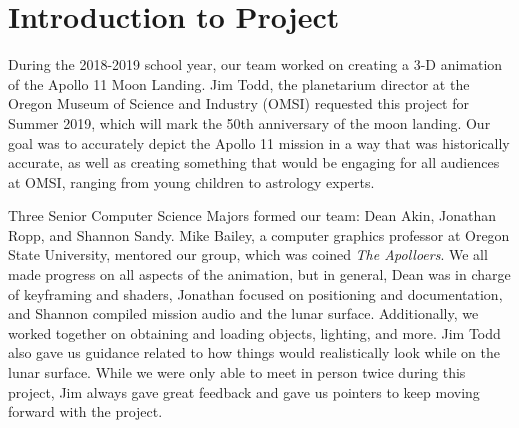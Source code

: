 \documentclass[onecolumn, draftclsnofoot,10pt, compsoc]{IEEEtran}
\begin{document}
\section{Introduction to Project}

During the 2018-2019 school year, our team worked on creating a 3-D animation of the  Apollo 11 Moon Landing. Jim Todd, the planetarium director at the Oregon Museum of Science and Industry (OMSI) requested this project for Summer 2019, which will mark the 50th anniversary of the moon landing. Our goal was to accurately depict the Apollo 11 mission in a way that was historically accurate, as well as creating something that would be engaging for all audiences at OMSI, ranging from young children to astrology experts. 

Three Senior Computer Science Majors formed our team: Dean Akin, Jonathan Ropp, and Shannon Sandy. Mike Bailey, a computer graphics professor at Oregon State University, mentored our group, which was coined \textit{The Apolloers}. We all made progress on all aspects of the animation, but in general, Dean was in charge of keyframing and shaders, Jonathan focused on positioning and documentation, and Shannon compiled mission audio and the lunar surface. Additionally, we worked together on obtaining and loading objects, lighting, and more. Jim Todd also gave us guidance related to how things would realistically look while on the lunar surface. While we were only able to meet in person twice during this project, Jim always gave great feedback and gave us pointers to keep moving forward with the project. 


\end{document}
